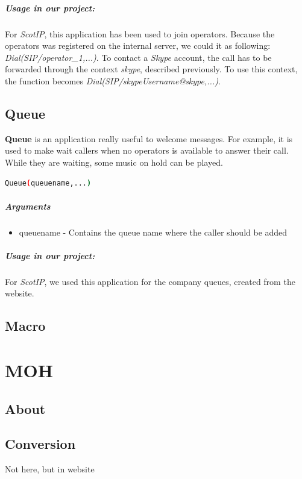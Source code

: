 \subparagraph{Usage in our project:}
For \textit{ScotIP}, this application has been used to join operators. Because the operators was registered on the internal server, we could it as following: \textit{Dial(SIP/operator\_1,...)}. To contact a \textit{Skype} account, the call has to be forwarded through the context \textit{skype}, described previously. To use this context, the function becomes \textit{Dial(SIP/skypeUsername@skype,...)}.





\subsection{Queue}
\textbf{Queue} is an application really useful to welcome messages. For example, it is used to make wait callers when no operators is available to answer their call. While they are waiting, some music on hold can be played. 


\begin{lstlisting}[language=bash,caption={Syntax of application Playback}]
Queue(queuename,...)
\end{lstlisting}

\subparagraph{Arguments}
\begin{itemize}

	\item queuename - Contains the queue name where the caller should be added
\end{itemize}

\subparagraph{Usage in our project:}
For \textit{ScotIP}, we used this application for the company queues, created from the website.


\subsection{Macro}



\section{MOH}
\subsection{About}
\subsection{Conversion}
Not here, but in website 
